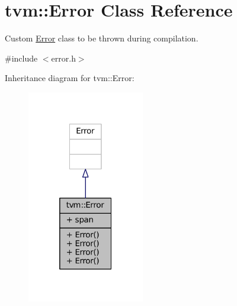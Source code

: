 \hypertarget{classtvm_1_1Error}{}\section{tvm\+:\+:Error Class Reference}
\label{classtvm_1_1Error}


Custom \hyperlink{classtvm_1_1Error}{Error} class to be thrown during compilation.  




{\ttfamily \#include $<$error.\+h$>$}



Inheritance diagram for tvm\+:\+:Error\+:
\nopagebreak
\begin{figure}[H]
\begin{center}
\leavevmode
\includegraphics[width=145pt]{classtvm_1_1Error__inherit__graph}
\end{center}
\end{figure}


